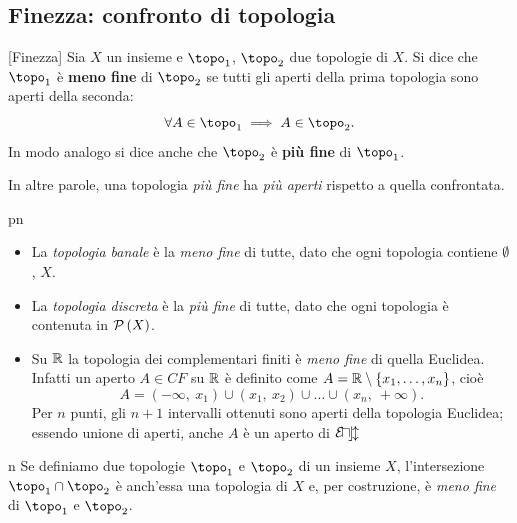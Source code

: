 \subsection{Finezza: confronto di topologia}
\begin{definition}{}[Finezza]
Sia $X$ un insieme e $\topo_1$, $\topo_2$ due topologie di $X$. Si dice che $\topo_1$ è \textbf{meno fine} di $\topo_2$ se tutti gli aperti della prima topologia sono aperti della seconda:
\begin{equation*}
\forall A\in\topo_1\implies A\in \topo_2.
\end{equation*}
In modo analogo si dice anche che $\topo_2$ è \textbf{più fine} di $\topo_1$.
\end{definition}
In altre parole, una topologia \textit{più fine} ha \textit{più aperti} rispetto a quella confrontata.
\begin{example}{pn}~{}
\begin{itemize}
\item La \textit{topologia banale} è la \textit{meno fine} di tutte, dato che ogni topologia contiene $\emptyset$, $X$.
\item La \textit{topologia discreta} è la \textit{più fine} di tutte, dato che ogni topologia è contenuta in $\mathcal{P}\left(X\right)$.
\item Su $\mathbb{R}$ la topologia dei complementari finiti è \textit{meno fine} di quella Euclidea. Infatti un aperto $A\in CF$ su $\mathbb{R}$ è definito come $A=\mathbb{R}\setminus\left\{x_1,\ldots,x_n\right\}$, cioè
\begin{equation*}
A=\left(-\infty,\ x_1\right)\cup\left(x_1,\ x_2\right)\cup\ldots\cup\left(x_n,\ +\infty\right).
\end{equation*}
Per $n$ punti, gli $n+1$ intervalli ottenuti sono aperti della topologia Euclidea; essendo unione di aperti, anche $A$ è un aperto di $\mathcal{E\! u\! c\! l}$
\end{itemize}
\end{example}
\begin{remark}{n}\label{intersezionetopo}
	Se definiamo due topologie $\topo_1$ e $\topo_2$ di un insieme $X$, l'intersezione $\topo_1\cap\topo_2$ è anch'essa una topologia di $X$ e, per costruzione, è \textit{meno fine} di $\topo_1$ e $\topo_2$.
\end{remark}
